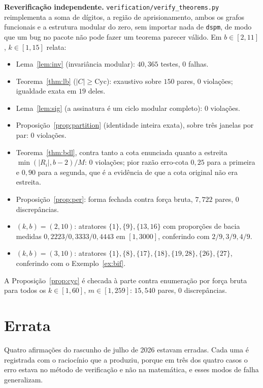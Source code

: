 \documentclass[11pt]{article}
\theoremstyle{definition}
\theoremstyle{remark}
\newcommand{\Cyc}{\mathrm{Cyc}}
\begin{document}
\medskip
\noindent\textbf{Reverificação independente.} \texttt{verification/verify\_theorems.py} reimplementa a soma de dígitos, a região de aprisionamento, ambos os grafos funcionais e a estrutura modular do zero, sem importar nada de \texttt{dspm}, de modo que um bug no pacote não pode fazer um teorema parecer válido. Em $b \in [2,11]$, $k \in [1,15]$ relata:
\begin{itemize}
\item Lema~\ref{lem:inv} (invariância modular): $40{,}365$ testes, 0 falhas.
\item Teorema~\ref{thm:lb} ($|C| \ge \Cyc$): exaustivo sobre $150$ pares, 0 violações; igualdade exata em $19$ deles.
\item Lema~\ref{lem:sig} (a assinatura é um ciclo modular completo): 0 violações.
\item Proposição~\ref{prop:partition} (identidade inteira exata), sobre três janelas por par: 0 violações.
\item Teorema~\ref{thm:bdl}, contra tanto a cota enunciada quanto a estreita $\min(|R_i|,b-2)/M$: 0 violações; pior razão erro-cota $0{,}25$ para a primeira e $0{,}90$ para a segunda, que é a evidência de que a cota original não era estreita.
\item Proposição~\ref{prop:per}: forma fechada contra força bruta, $7{,}722$ pares, 0 discrepâncias.
\item $(k,b)=(2,10)$: atratores $\{1\},\{9\},\{13,16\}$ com proporções de bacia medidas $0{,}2223/0{,}3333/0{,}4443$ em $[1,3000]$, conferindo com $2/9, 3/9, 4/9$.
\item $(k,b)=(3,10)$: atratores $\{1\},\{8\},\{17\},\{18\},\{19,28\},\{26\},\{27\}$, conferindo com o Exemplo~\ref{ex:bif}.
\end{itemize}

A Proposição~\ref{prop:cyc} é checada à parte contra enumeração por força bruta para todos os $k \in [1,60]$, $m \in [1,259]$: $15{,}540$ pares, 0 discrepâncias.

\section{Errata}\label{app:errata}

Quatro afirmações do rascunho de julho de 2026 estavam erradas. Cada uma é registrada com o raciocínio que a produziu, porque em três dos quatro casos o erro estava no método de verificação e não na matemática, e esses modos de falha generalizam.
\end{document}
